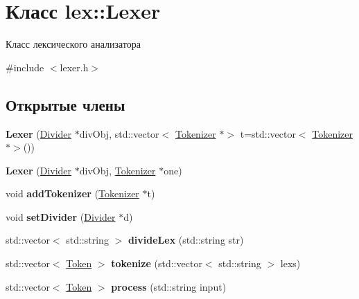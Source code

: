 \hypertarget{classlex_1_1_lexer}{}\section{Класс lex\+:\+:Lexer}
\label{classlex_1_1_lexer}


Класс лексического анализатора  




{\ttfamily \#include $<$lexer.\+h$>$}

\subsection*{Открытые члены}
\begin{DoxyCompactItemize}
\item 
\mbox{\label{classlex_1_1_lexer_a4c3c63439f64bf232e8995aaa555a7e4}} 
{\bfseries Lexer} (\mbox{\hyperlink{classlex_1_1_divider}{Divider}} $\ast$div\+Obj, std\+::vector$<$ \mbox{\hyperlink{classlex_1_1_tokenizer}{Tokenizer}} $\ast$$>$ t=std\+::vector$<$ \mbox{\hyperlink{classlex_1_1_tokenizer}{Tokenizer}} $\ast$$>$())
\item 
\mbox{\label{classlex_1_1_lexer_a64c1af615d7d401c0e6fcbf0c0c8e02b}} 
{\bfseries Lexer} (\mbox{\hyperlink{classlex_1_1_divider}{Divider}} $\ast$div\+Obj, \mbox{\hyperlink{classlex_1_1_tokenizer}{Tokenizer}} $\ast$one)
\item 
\mbox{\label{classlex_1_1_lexer_a950c6154df77c2be981ae428d901eb48}} 
void {\bfseries add\+Tokenizer} (\mbox{\hyperlink{classlex_1_1_tokenizer}{Tokenizer}} $\ast$t)
\item 
\mbox{\label{classlex_1_1_lexer_aa07e79c06cf0c6cddb8298f5251c8233}} 
void {\bfseries set\+Divider} (\mbox{\hyperlink{classlex_1_1_divider}{Divider}} $\ast$d)
\item 
\mbox{\label{classlex_1_1_lexer_a8bb714aa6804f70ad492812953ceb63e}} 
std\+::vector$<$ std\+::string $>$ {\bfseries divide\+Lex} (std\+::string str)
\item 
\mbox{\label{classlex_1_1_lexer_aaecb73d7dce83e7dc0bbea31a8d2ead5}} 
std\+::vector$<$ \mbox{\hyperlink{classlex_1_1_token}{Token}} $>$ {\bfseries tokenize} (std\+::vector$<$ std\+::string $>$ lexs)
\item 
\mbox{\label{classlex_1_1_lexer_aed0a4a34bf17a219fec3c9d51d9970aa}} 
std\+::vector$<$ \mbox{\hyperlink{classlex_1_1_token}{Token}} $>$ {\bfseries process} (std\+::string input)
\end{DoxyCompactItemize}


